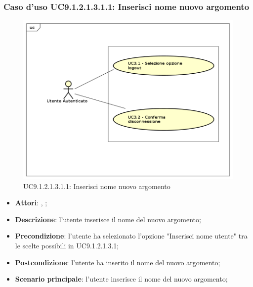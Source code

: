 							\subsubsection{Caso d'uso UC9.1.2.1.3.1.1: Inserisci nome nuovo argomento}
							\label{UC9.1.2.1.3.1.1}
							\begin{figure}[h]
								\centering
								\includegraphics[scale=0.5,keepaspectratio]{UML/UC9.png}
								\caption{UC9.1.2.1.3.1.1: Inserisci nome nuovo argomento}
							\end{figure}
							\FloatBarrier
							\begin{itemize}
								\item \textbf{Attori}: \uau, \uaupro;
								\item \textbf{Descrizione}: l'utente inserisce il nome del nuovo argomento;
								\item \textbf{Precondizione}: l'utente ha selezionato l'opzione "Inserisci nome utente" tra le scelte possibili in UC9.1.2.1.3.1;
								\item \textbf{Postcondizione}: l'utente ha inserito il nome del nuovo argomento;
								\item \textbf{Scenario principale}: l'utente inserisce il nome del nuovo argomento;
							\end{itemize}
							

